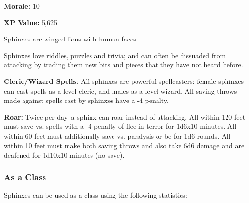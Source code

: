 \begin{multicols*}{2}
{\textbf{Morale:} 10

\textbf{XP Value:} 5,625}

Sphinxes are winged lions with human faces.

Sphinxes love riddles, puzzles and trivia; and can often be dissuaded from attacking by trading them new bits and pieces that they have not heard before.

\textbf{Cleric/Wizard Spells:} All sphinxes are powerful spellcasters: female sphinxes can cast spells as a  level cleric, and males as a  level wizard. All saving throws made against spells cast by sphinxes have a -4 penalty.

\textbf{Roar:} Twice per day, a sphinx can roar instead of attacking. All within 120 feet must save vs. spells with a -4 penalty of flee in terror for 1d6x10 minutes. All within 60 feet must additionally save vs. paralysis or be   for 1d6 rounds. All within 10 feet must make both saving throws and also take 6d6 damage and are deafened for 1d10x10 minutes (no save).

\subsubsection{As a Class}
Sphinxes can be used as a class using the following statistics:



\end{multicols*}
